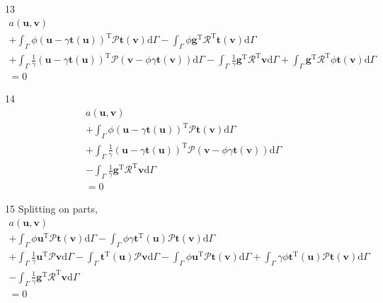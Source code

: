 \documentclass[a4paper,12pt]{article}
\begin{document}
13
\begin{equation}
\begin{split}
a(\mathbf{u},\mathbf{v})
\\+
\int_\Gamma
\phi
(
\mathbf{u}-\gamma\mathbf{t}(\mathbf{u})
)^\textrm{T}\mathcal{P}
\mathbf{t}(\mathbf{v})
\textrm{d}\Gamma
-
\int_\Gamma
\phi
\mathbf{g}^\textrm{T}\mathcal{R}^\textrm{T}
\mathbf{t}(\mathbf{v})
\textrm{d}\Gamma
\\+
\int_\Gamma
\frac{1}{\gamma}
(
\mathbf{u}-\gamma\mathbf{t}(\mathbf{u})
)^\textrm{T}\mathcal{P}
(\mathbf{v}-\phi\gamma\mathbf{t}(\mathbf{v}))
\textrm{d}\Gamma
-
\int_\Gamma
\frac{1}{\gamma}
\mathbf{g}^\textrm{T}\mathcal{R}^\textrm{T}
\mathbf{v}
\textrm{d}\Gamma
+
\int_\Gamma
\mathbf{g}^\textrm{T}\mathcal{R}^\textrm{T}
\phi\mathbf{t}(\mathbf{v})
\textrm{d}\Gamma
\\=
0
\end{split}
\end{equation}


14
\begin{equation}
\begin{split}
a(\mathbf{u},\mathbf{v})
\\+
\int_\Gamma
\phi
(
\mathbf{u}-\gamma\mathbf{t}(\mathbf{u})
)^\textrm{T}\mathcal{P}
\mathbf{t}(\mathbf{v})
\textrm{d}\Gamma
\\+
\int_\Gamma
\frac{1}{\gamma}
(
\mathbf{u}-\gamma\mathbf{t}(\mathbf{u})
)^\textrm{T}\mathcal{P}
(\mathbf{v}-\phi\gamma\mathbf{t}(\mathbf{v}))
\textrm{d}\Gamma
\\-
\int_\Gamma
\frac{1}{\gamma}
\mathbf{g}^\textrm{T}\mathcal{R}^\textrm{T}
\mathbf{v}
\textrm{d}\Gamma
\\=
0
\end{split}
\end{equation}

15
Splitting on parts,
\begin{equation}
\begin{split}
a(\mathbf{u},\mathbf{v})
\\+
\int_\Gamma
\phi
\mathbf{u}^\textrm{T}\mathcal{P}
\mathbf{t}(\mathbf{v})
\textrm{d}\Gamma
-
\int_\Gamma
\phi
\gamma\mathbf{t}^\textrm{T}(\mathbf{u})
\mathcal{P}\mathbf{t}(\mathbf{v})
\textrm{d}\Gamma
\\+
\int_\Gamma
\frac{1}{\gamma}
\mathbf{u}^\textrm{T}
\mathcal{P}\mathbf{v}
\textrm{d}\Gamma
-
\int_\Gamma
\mathbf{t}^\textrm{T}(\mathbf{u})
\mathcal{P}\mathbf{v}
\textrm{d}\Gamma
-
\int_\Gamma
\phi
\mathbf{u}^\textrm{T}
\mathcal{P}\mathbf{t}(\mathbf{v})
\textrm{d}\Gamma
+
\int_\Gamma
\gamma\phi
\mathbf{t}^\textrm{T}(\mathbf{u})
\mathcal{P}\mathbf{t}(\mathbf{v})
\textrm{d}\Gamma
\\-
\int_\Gamma
\frac{1}{\gamma}
\mathbf{g}^\textrm{T}\mathcal{R}^\textrm{T}
\mathbf{v}
\textrm{d}\Gamma
\\=
0
\end{split}
\end{equation}
\end{document}
